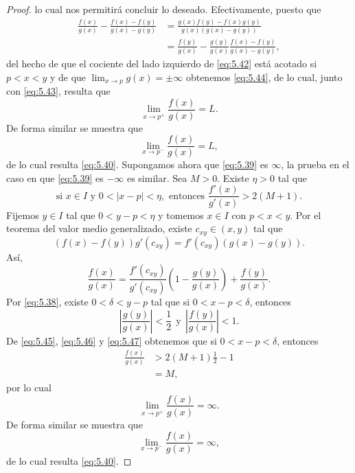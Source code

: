 \documentclass[12pt,a4paper]{book}
\begin{document}
\begin{proof}
        lo cual nos permitirá concluir lo deseado. Efectivamente, puesto que
        \begin{align*}
            \frac{f(x)}{g(x)}-\frac{f(x)-f(y)}{g(x)-g(y)}&=\frac{g(x)f(y)-f(x)g(y)}{g(x)(g(x)-g(y))}\\
            &=\frac{f(y)}{g(x)}-\frac{g(y)}{g(x)}\frac{f(x)-f(y)}{g(x)-g(y)},
        \end{align*}
        del hecho de que el cociente del lado izquierdo de \eqref{eq:5.42} está acotado si
        $p<x<y$ y de que $\lim_{x\to p}g(x)=\pm\infty$ obtenemos \eqref{eq:5.44}, de lo cual, junto
        con \eqref{eq:5.43}, resulta que
        \begin{equation*}
            \lim_{x\to p^{+}}\frac{f(x)}{g(x)}=L.
        \end{equation*}
        De forma similar se muestra que
        \begin{equation*}
            \lim_{x\to p^{-}}\frac{f(x)}{g(x)}=L,
        \end{equation*}
        de lo cual resulta \eqref{eq:5.40}. Supongamos ahora que \eqref{eq:5.39} es $\infty$, la prueba en el
        caso en que \eqref{eq:5.39} es $-\infty$ es similar. Sea $M>0$. Existe $\eta>0$ tal que
        \begin{equation}\label{eq:5.45}
            \text{si }x\in I\text{ y }0<|x-p|<\eta,\text{ entonces }\frac{f'(x)}{g'(x)}>2(M+1).
        \end{equation}
        Fijemos $y\in I$ tal que $0<y-p<\eta$ y tomemos $x\in I$ con $p<x<y$. Por el
        teorema del valor medio generalizado, existe $c_{xy}\in(x,y)$ tal que
        \begin{equation*}
            (f(x)-f(y))g'(c_{xy})=f'(c_{xy})(g(x)-g(y)).
        \end{equation*}
        Así,
        \begin{equation}\label{eq:5.46}
            \frac{f(x)}{g(x)}=\frac{f'(c_{xy})}{g'(c_{xy})}\left(1-\frac{g(y)}{g(x)}\right)+\frac{f(y)}{g(x)}.
        \end{equation}
        Por \eqref{eq:5.38}, existe $0<\delta<y-p$ tal que si $0<x-p<\delta$, entonces
        \begin{equation}\label{eq:5.47}
            \left|\frac{g(y)}{g(x)}\right|<\frac{1}{2}\ \ \text{y}\ \ \left|\frac{f(y)}{g(x)}\right|<1.
        \end{equation}
        De \eqref{eq:5.45}, \eqref{eq:5.46} y \eqref{eq:5.47} obtenemos que si $0<x-p<\delta$, entonces
        \begin{align*}
            \frac{f(x)}{g(x)}&>2(M+1)\frac{1}{2}-1\\
            &=M,
        \end{align*}
        por lo cual
        \begin{equation*}
            \lim_{x\to p^{+}}\frac{f(x)}{g(x)}=\infty.
        \end{equation*}
        De forma similar se muestra que
        \begin{equation*}
            \lim_{x\to p^{-}}\frac{f(x)}{g(x)}=\infty,
        \end{equation*}
        de lo cual resulta \eqref{eq:5.40}.
    \end{proof}
\end{document}
